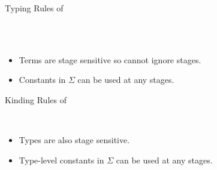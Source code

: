 \documentclass[dvipdfmx,aspectratio=169, 20pt]{beamer}
\begin{document}
\begin{frame}[fragile]{Typing Rules of \LMD}
    \begin{center}
         \\[2mm]
         \\[2mm]
    \end{center}
    \begin{itemize}
        \item Terms are stage sensitive so cannot ignore stages.
        \item Constants in \( \Sigma \) can be used at any stages.
    \end{itemize}
\end{frame}

\begin{frame}[fragile]{Kinding Rules of \LMD}
    \begin{center}
        \\[2mm]
    \end{center}
    \begin{itemize}
        \item Types are also stage sensitive.
        \item Type-level constants in \( \Sigma \) can be used at any stages.
    \end{itemize}
\end{frame}
\end{document}
